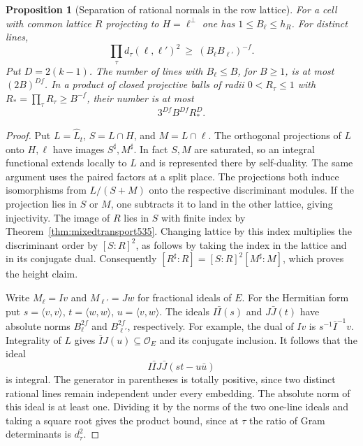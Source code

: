 \documentclass[a4paper,11pt]{article}
\newtheorem{proposition}{Proposition}[section]
\theoremstyle{definition}
\theoremstyle{remark}
\numberwithin{equation}{section}
\begin{document}
\begin{proposition}[Separation of rational normals in the row lattice]
\leavevmode\label{prop:normalseparation610}
For a cell with common lattice \(R\) projecting to \(H=\ell^\perp\)
one has \(1\le B_\ell\le h_R\). For distinct lines,
\[
     \prod_\tau d_\tau(\ell,\ell')^2\ \ge\ (B_\ell B_{\ell'})^{-f}.
\]
Put \(D=2(k-1)\). The number of lines with \(B_\ell\le B\), for
\(B\ge1\), is at most \((2B)^{Df}\). In a product of closed
projective balls of radii \(0<R_\tau\le1\) with
\(R_*=\prod_\tau R_\tau\ge B^{-f}\), their number is at most
\[
                   3^{Df} B^{Df} R_*^D .
\]
\end{proposition}
\begin{proof}
Put \(L=\widehat L_t\), \(S=L\cap H\), and \(M=L\cap\ell\).
The orthogonal projections of \(L\) onto \(H,\ell\) have
images \(S^\sharp,M^\sharp\). In fact \(S,M\) are saturated,
so an integral functional extends locally to \(L\) and is represented
there by self-duality. The same argument uses the paired factors
at a split place. The projections both induce isomorphisms from
\(L/(S+M)\) onto the respective discriminant modules. If the
projection lies in \(S\) or \(M\), one subtracts it to land in
the other lattice, giving injectivity. The image of \(R\) lies
in \(S\) with finite index by Theorem~\ref{thm:mixedtransport535}.
Changing lattice by this index multiplies the discriminant order
by \([S:R]^2\), as follows by taking the index in the lattice and
in its conjugate dual. Consequently
\([R^\sharp:R]=[S:R]^2[M^\sharp:M]\), which proves the height claim.

Write \(M_\ell=Iv\) and \(M_{\ell'}=Jw\) for fractional ideals
of \(E\). For the Hermitian form put \(s=\langle v,v\rangle\),
\(t=\langle w,w\rangle\), \(u=\langle v,w\rangle\).
The ideals \(I\bar I(s)\) and \(J\bar J(t)\) have absolute norms
\(B_\ell^{2f}\) and \(B_{\ell'}^{2f}\), respectively. For
example, the dual of \(Iv\) is \(s^{-1}\bar I^{-1}v\).
Integrality of \(L\) gives \(\bar I J(u)\subseteq\mathcal O_E\)
and its conjugate inclusion. It follows that the ideal
\[
                I\bar I J\bar J(st-u\bar u)
\]
is integral. The generator in parentheses is totally positive,
since two distinct rational lines remain independent under every
embedding. The absolute norm of this ideal is at least one.
Dividing it by the norms of the two one-line ideals and taking
a square root gives the product bound, since at \(\tau\) the
ratio of Gram determinants is \(d_\tau^2\).


\end{proof}
\end{document}

